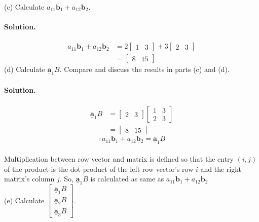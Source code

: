 (c) Calculate $a_{11}\mathbf{b}_1+a_{12}\mathbf{b}_2$.
\paragraph{Solution.}
\begin{align*}
    a_{11}\mathbf{b}_1+a_{12}\mathbf{b}_2 &= 2\begin{bmatrix}
        1&3
    \end{bmatrix} + 3\begin{bmatrix}
        2&3
    \end{bmatrix}\\&=\begin{bmatrix}
        8&15
    \end{bmatrix}
\end{align*}
\newpage
(d) Calculate $\underline{\mathbf{a}}_1B$. Compare and discuss the results in parts (c) and (d).
\paragraph{Solution.}
\begin{align*}
    \underline{\mathbf{a}}_1B &= \begin{bmatrix}
        2&3
    \end{bmatrix}\begin{bmatrix}
        1&3\\2&3
    \end{bmatrix}\\&=\begin{bmatrix}
        8&15
    \end{bmatrix}
\end{align*}
$$\therefore a_{11}\mathbf{b}_1+a_{12}\mathbf{b}_2 = \underline{\mathbf{a}}_1B$$\\
Multiplication between row vector and matrix is defined so that the entry $(i, j)$ of the product is the dot product of the
left row vector's row $i$ and the right matrix's column $j$. So, $\underline{\mathbf{a}}_1B$ is calculated as same as $a_{11}\mathbf{b}_1+a_{12}\mathbf{b}_2$\\

(e) Calculate $\begin{bmatrix}
    \underline{\mathbf{a}}_1B\\
    \underline{\mathbf{a}}_2B\\
    \underline{\mathbf{a}}_3B
\end{bmatrix}$.
